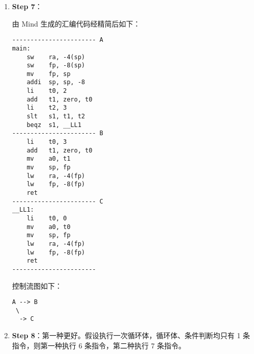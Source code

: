 \documentclass[a4paper]{article}
\begin{document}
\begin{enumerate}
    \item \textbf{Step 7}：

          由 Mind 生成的汇编代码经精简后如下：
          \begin{lstlisting}
----------------------- A
main:
    sw    ra, -4(sp)
    sw    fp, -8(sp)
    mv    fp, sp
    addi  sp, sp, -8
    li    t0, 2
    add   t1, zero, t0
    li    t2, 3
    slt   s1, t1, t2
    beqz  s1, __LL1
----------------------- B
    li    t0, 3
    add   t1, zero, t0
    mv    a0, t1
    mv    sp, fp
    lw    ra, -4(fp)
    lw    fp, -8(fp)
    ret
----------------------- C
__LL1:
    li    t0, 0
    mv    a0, t0
    mv    sp, fp
    lw    ra, -4(fp)
    lw    fp, -8(fp)
    ret
-----------------------
\end{lstlisting}

          控制流图如下：
          \begin{lstlisting}
A --> B
 \
  -> C
\end{lstlisting}
    \item \textbf{Step 8}：第一种更好。假设执行一次循环体，循环体、条件判断均只有 1 条指令，则第一种执行 6 条指令，第二种执行 7 条指令。
\end{enumerate}
\end{document}
